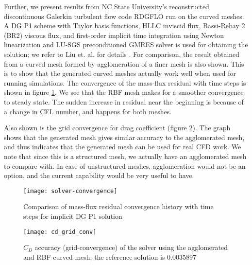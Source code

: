 Further, we present results from NC State University's reconstructed discontinuous Galerkin turbulent flow code RDGFLO run on the curved meshes. A DG P1 scheme with Taylor basis functions, HLLC inviscid flux, Bassi-Rebay 2 (BR2) viscous flux, and first-order implicit time integration using Newton linearization and LU-SGS preconditioned GMRES solver is used for obtaining the solution; we refer to Liu et. al. for details \cite{solver}. For comparison, the result obtained from a curved mesh formed by agglomeration of a finer mesh is also shown. This is to show that the generated curved meshes actually work well when used for running simulations. The convergence of the mass-flux residual with time steps is shown in figure \ref{fig:resconvergence}. We see that the RBF mesh makes for a smoother convergence to steady state. The sudden increase in residual near the beginning is because of a change in CFL number, and happens for both meshes.

Also shown is the grid convergence for drag coefficient (figure \ref{fig:gridconvergence}). The graph shows that the generated mesh gives similar accuracy to the agglomerated mesh, and thus indicates that the generated mesh can be used for real CFD work. We note that since this is a structured mesh, we actually have an agglomerated mesh to compare with. In case of unstructured meshes, agglomeration would not be an option, and the current capability would be very useful to have.
\begin{figure}
	\centering
	\texttt{[image: solver-convergence]}
	\caption{Comparison of mass-flux residual convergence history with time steps for implicit DG P1 solution}
	\label{fig:resconvergence}
\end{figure}

\begin{figure}
	\centering
	\texttt{[image: cd\_grid\_conv]}
	\caption{$C_D$ accuracy (grid-convergence) of the solver using the agglomerated and RBF-curved mesh; the reference solution \cite{case:bump3d} is 0.0035897}
	\label{fig:gridconvergence}
\end{figure}